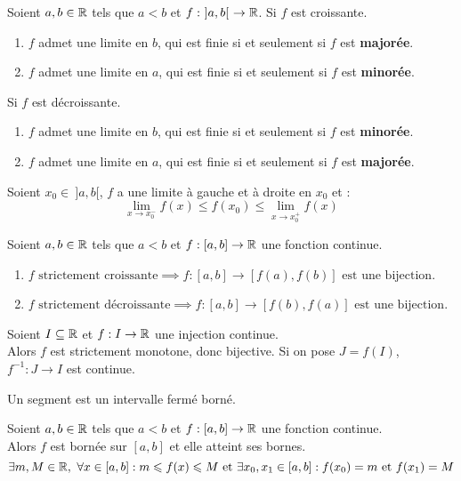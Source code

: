 \begin{theorem}
	Soient $a, b \in \mathbb{R}$ tels que $a < b$ et $f :\ ]a, b[ \ \to \mathbb{R}$. 
	Si $f$ est croissante.
	\begin{enumerate}
		\item $f$ admet une limite en $b$, qui est finie si et seulement si $f$ est \textbf{majorée}.
		\item $f$ admet une limite en $a$, qui est finie si et seulement si $f$ est \textbf{minorée}.
	\end{enumerate}
	Si $f$ est décroissante.
	\begin{enumerate}
		\item $f$ admet une limite en $b$, qui est finie si et seulement si $f$ est \textbf{minorée}.
		\item $f$ admet une limite en $a$, qui est finie si et seulement si $f$ est \textbf{majorée}.
	\end{enumerate}
	Soient $x_0 \in \ ]a, b[$, $f$ a une limite à gauche et à droite en $x_0$ et :
	\[ \lim_{x \to x_0^-} f(x) \leq f(x_0) \leq \lim_{x \to x_0^+} f(x) \]
\end{theorem}

\begin{theorem}
	Soient $a, b \in \mathbb{R}$ tels que $a < b$ et $f : [a, b] \to \mathbb{R}$ une fonction continue.
	\begin{enumerate}
	    \item $ f \text{ strictement croissante} \implies f : [a, b] \to [f(a), f(b)] \text{ est une bijection} $.
            \item $ f \text{ strictement décroissante} \implies f : [a, b] \to [f(b), f(a)] \text{ est une bijection} $.
	\end{enumerate}
\end{theorem}

\begin{theorem}
	Soient $I \subseteq \mathbb{R}$ et $f : I \to \mathbb{R}$ une injection continue.
	\\
	Alors $f$ est strictement monotone, donc bijective. Si on pose $J = f(I)$, $f^{-1} : J \to I$ est continue.
\end{theorem}

\begin{definition}[Segment]
	Un segment est un intervalle fermé borné.
\end{definition}

\begin{theorem}
	Soient $a, b \in \mathbb{R}$ tels que $a < b$ et $f : [a, b] \to \mathbb{R}$ une fonction continue.
	\\
	Alors $f$ est bornée sur $[a, b]$ et elle atteint ses bornes.
	\[ \exists m, M \in \mathbb{R},\ \forall x \in [a, b] : m \leqslant f(x) \leqslant M \text{ et } \exists x_0, x_1 \in [a, b] : f(x_0) = m \text{ et } f(x_1) = M \]
\end{theorem}

